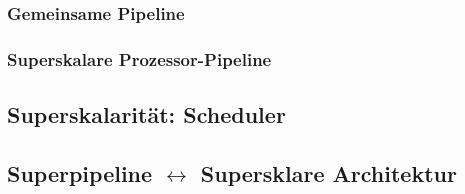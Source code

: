 \subsubsection{Gemeinsame Pipeline}

\subsubsection{Superskalare Prozessor-Pipeline}

\subsection{Superskalarität: Scheduler}


\subsection[Superpipeline <-> Supersklare Architektur]{Superpipeline $\leftrightarrow$ Supersklare Architektur}







